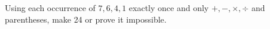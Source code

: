 Using each occurrence of $7,6,4,1$ exactly once and only $+,-,\times,\div$ and parentheses, make 24 or prove it impossible.
